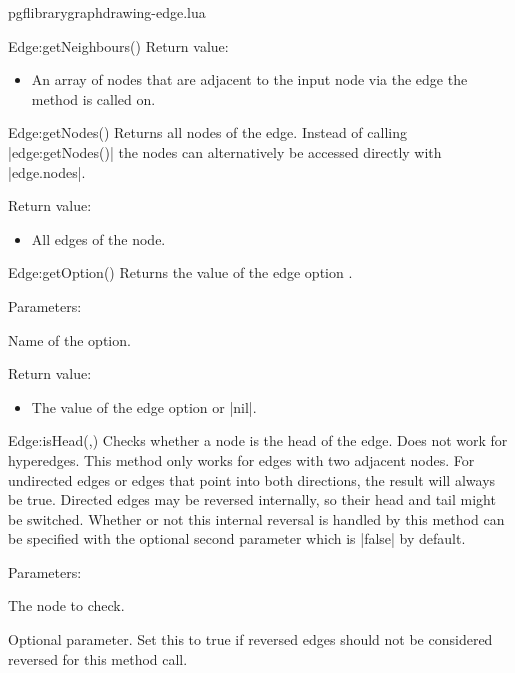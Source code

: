 \begin{filedescription}{pgflibrarygraphdrawing-edge.lua}
\begin{luacommand}{{Edge:getNeighbours}()}
Return value:
\begin{itemize} \item[] An array of nodes that are adjacent to the input node via the edge the method is called on.  \end{itemize}


\end{luacommand}\begin{luacommand}{{Edge:getNodes}()}
Returns all nodes of the edge.  Instead of calling |edge:getNodes()| the nodes can alternatively be accessed directly with |edge.nodes|. 


Return value:
\begin{itemize} \item[] All edges of the node.  \end{itemize}


\end{luacommand}\begin{luacommand}{{Edge:getOption}()}
Returns the value of the edge option . 

Parameters:
\begin{parameterdescription}
	\item[\meta{name}] Name of the option. 
\end{parameterdescription}


Return value:
\begin{itemize} \item[] The value of the edge option  or |nil|.  \end{itemize}


\end{luacommand}\begin{luacommand}{{Edge:isHead}(,)}
Checks whether a node is the head of the edge. Does not work for hyperedges.  This method only works for edges with two adjacent nodes.  For undirected edges or edges that point into both directions, the result will always be true. Directed edges may be reversed internally, so their head and tail might be switched. Whether or not this internal reversal is handled by this method can be specified with the optional second  parameter which is |false| by default. 

Parameters:
\begin{parameterdescription}
	\item[\meta{node}] The node to check.\item[\meta{ignorereversed}] Optional parameter. Set this to true if reversed edges should not be considered reversed for this method call. 
\end{parameterdescription}



\end{luacommand}
\end{filedescription}

